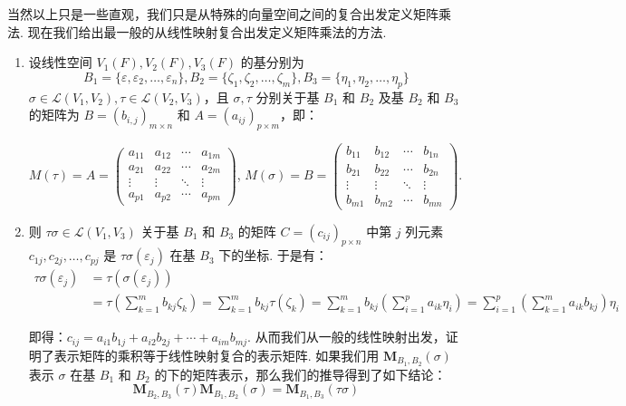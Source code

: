 当然以上只是一些直观，我们只是从特殊的向量空间之间的复合出发定义矩阵乘法. 现在我们给出最一般的从线性映射复合出发定义矩阵乘法的方法.

\begin{enumerate}
    \item 设线性空间 $V_1(F), V_2(F), V_3(F)$ 的基分别为
    \[B_1 = \{\varepsilon, \varepsilon_2,\ldots,\varepsilon_n\}, B_2 = \{\zeta_1,\zeta_2,\ldots,\zeta_m\}, B_3 = \{\eta_1,\eta_2,\ldots,\eta_p\}\]
    $\sigma \in \mathcal{L}(V_1,V_2), \tau \in \mathcal{L}(V_2,V_3)$，且 $\sigma, \tau$ 分别关于基 $B_1$ 和 $B_2$ 及基 $B_2$ 和 $B_3$ 的矩阵为 $B=(b_{i,j})_{m \times n}$ 和 $A=(a_{ij})_{p\times m}$，即：

          $M(\tau)=A=\begin{pmatrix}
                  a_{11} & a_{12} & \cdots & a_{1m} \\
                  a_{21} & a_{22} & \cdots & a_{2m} \\
                  \vdots & \vdots & \ddots & \vdots \\
                  a_{p1} & a_{p2} & \cdots & a_{pm}
              \end{pmatrix}$,
          $M(\sigma)=B=\begin{pmatrix}
                  b_{11} & b_{12} & \cdots & b_{1n} \\
                  b_{21} & b_{22} & \cdots & b_{2n} \\
                  \vdots & \vdots & \ddots & \vdots \\
                  b_{m1} & b_{m2} & \cdots & b_{mn}
              \end{pmatrix}$.

    \item 则 $\tau\sigma \in \mathcal{L}(V_1,V_3)$ 关于基 $B_1$ 和 $B_3$ 的矩阵 $C=(c_{ij})_{p\times n}$ 中第 $j$ 列元素 $c_{1j},c_{2j},\ldots,c_{pj}$ 是 $\tau\sigma(\varepsilon_j)$ 在基 $B_3$ 下的坐标. 于是有：
          \begin{align*}
            \tau\sigma(\varepsilon_j) &= \tau(\sigma(\varepsilon_j)) \\
            &= \tau\left(\sum_{k=1}^{m}b_{kj}\zeta_k\right) = \sum_{k=1}^{m}b_{kj}\tau(\zeta_k) = \sum_{k=1}^{m}b_{kj}\left(\sum_{i=1}^{p}a_{ik}\eta_i\right) = \sum_{i=1}^{p}\left(\sum_{k=1}^{m}a_{ik}b_{kj}\right)\eta_i
          \end{align*}

          即得：$c_{ij}=a_{i1}b_{1j}+a_{i2}b_{2j}+\cdots+a_{im}b_{mj}$. 从而我们从一般的线性映射出发，证明了表示矩阵的乘积等于线性映射复合的表示矩阵. 如果我们用 $\mathbf{M}_{ B_1, B_2}(\sigma)$ 表示 $\sigma$ 在基 $B_1$ 和 $B_2$ 的下的矩阵表示，那么我们的推导得到了如下结论：
          \begin{equation} \label{eq:矩阵乘法的定义}
            \mathbf{M}_{ B_2, B_3} (\tau) \mathbf{M}_{ B_1, B_2} (\sigma) = \mathbf{M}_{ B_1, B_3} (\tau \sigma)
          \end{equation}


\end{enumerate}
